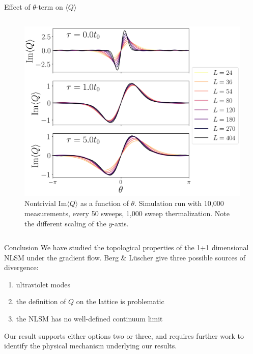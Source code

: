 \documentclass[18pt]{beamer}
\begin{document}
\begin{frame}{}
\begin{columns}[t]
\begin{column}{0.32\linewidth}
\begin{block}{Effect of $\theta$-term on $\langle Q \rangle$}
\begin{columns}
            \begin{column}{0.55\textwidth}
                \begin{figure}[h]
                  \centering
                  \includegraphics[width=\textwidth]{theta.png}
                  \caption{\label{fig:theta} Nontrivial $\mathrm{Im}\langle Q \rangle$ as a function of $\theta$. Simulation run with 10,000 measurements, every 50 sweeps, 1,000 sweep thermalization. Note the different scaling of the $y$-axis.}
                \end{figure}
            \end{column}
        \end{columns}

    \end{block}

    \begin{block}{Conclusion}
We have studied the topological properties of the 1+1 dimensional NLSM under the gradient flow. Berg \& L\"uscher \cite{berg1981} give three possible sources of divergence:
        {\setlength\parindent{5pt}\begin{enumerate}
                \item ultraviolet modes
                \item the definition of $Q$ on the lattice is problematic
                \item the NLSM has no well-defined continuum limit
        \end{enumerate}}
        Our result supports either options two or three, and requires further work to identify the physical mechanism underlying our results.
    \end{block}

    \end{column}%


  \end{columns}
\end{frame}
\end{document}
